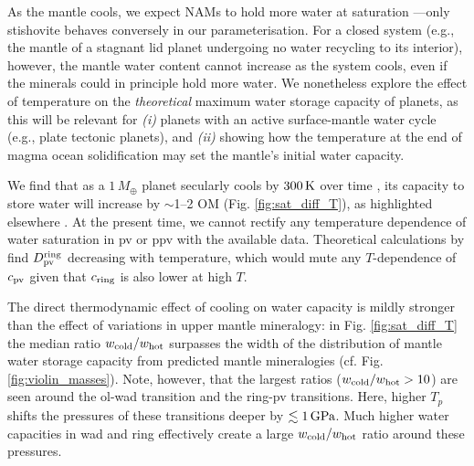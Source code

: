 \documentclass[fleqn,usenatbib]{mnras}
\begin{document}
As the mantle cools, we expect NAMs to hold more water at saturation \citep{keppler_thermodynamics_2006}---only stishovite behaves conversely in our parameterisation. For a closed system (e.g., the mantle of a stagnant lid planet undergoing no water recycling to its interior), however, the mantle water content cannot increase as the system cools, even if the minerals could in principle hold more water. We nonetheless explore the effect of temperature on the \textit{theoretical} maximum water storage capacity of planets, as this will be relevant for \textit{(i)} planets with an active surface-mantle water cycle (e.g., plate tectonic planets), and \textit{(ii)} showing how the temperature at the end of magma ocean solidification may set the mantle's initial water capacity.

We find that as a $1\,M_\oplus$ planet secularly cools by $300\,{\rm K}$ over time \citep[an amount by which Earth's own mantle may have cooled over its history;][]{herzberg_thermal_2010}, its capacity to store water will increase by $\sim$1--2 OM (Fig. \ref{fig:sat_diff_T}), as highlighted elsewhere \citep{shah_internal_2021, dong_constraining_2021, andrault_mantle_2022}. At the present time, we cannot rectify any temperature dependence of water saturation in pv or ppv with the available data. Theoretical calculations by \citet{hernandez_incorporation_2013} find $D^{\rm ring}_{\rm pv}$ decreasing with temperature, which would mute any $T$-dependence of $c_{\rm pv}$ given that $c_{\rm ring}$ is also lower at high $T$.

The direct thermodynamic effect of cooling on water capacity is mildly stronger than the effect of variations in upper mantle mineralogy: in Fig. \ref{fig:sat_diff_T} the median ratio $w_{\rm cold}/w_{\rm hot}$ surpasses the width of the distribution of mantle water storage capacity from predicted mantle mineralogies (cf. Fig. \ref{fig:violin_masses}). Note, however, that the largest ratios ($w_{\rm cold}/w_{\rm hot}>10$) are seen around the ol-wad transition and the ring-pv transitions. Here, higher $T_p$ shifts the pressures of these transitions deeper by $\lesssim1\,{\rm GPa}$. Much higher water capacities in wad and ring effectively create a large $w_{\rm cold}/w_{\rm hot}$ ratio around these pressures.
\medskip
\end{document}
